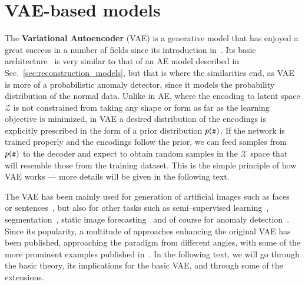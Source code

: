 \section{VAE-based models} \label{sec:vae_models}
The \textbf{Variational Autoencoder} (VAE) is a generative model that has enjoyed a great success in a number of fields since its introduction in~\cite{kingma2013vae}. Its basic architecture~\cite{kingma2019introduction} is very similar to that of an AE model described in Sec.~\ref{sec:reconstruction_models}, but that is where the similarities end, as VAE is more of a probabilistic anomaly detector, since it models the probability distribution of the normal data. Unlike in AE, where the encoding to latent space $\mathcal{Z}$ is not constrained from taking any shape or form as far as the learning objective is minimized, in VAE a desired distribution of the encodings is explicitly prescribed in the form of a prior distribution $p(\pmb{{z}})$. If the network is trained properly and the encodings follow the prior, we can feed samples from $p(\pmb{{z}})$ to the decoder and expect to obtain random samples in the $\mathcal{X}$ space that will resemble those from the training dataset. This is the simple principle of how VAE works --- more details will be given in the following text.

The VAE has been mainly used for generation of artificial images such as faces~\cite{rezende2014stochastic} or sentences~\cite{bowman2015generating}, but also for other tasks such as semi--supervised learning~\cite{kingma2014semi}, segmentation~\cite{sohn2015learning}, static image forecasting~\cite{walker2016uncertain} and of course for anomaly detection~\cite{an2015variational,xu2018unsupervised,solch2016variational}. Since its popularity, a multitude of approaches enhancing the original VAE has been published, approaching the paradigm from different angles, with some of the more prominent examples published in~\cite{higgins2017beta,zhao2017infovae,tolstikhin2017wasserstein,makhzani2015adversarial,pu2017adversarial}. In the following text, we will go through the basic theory, its implications for the basic VAE, and through some of the extensions. 

